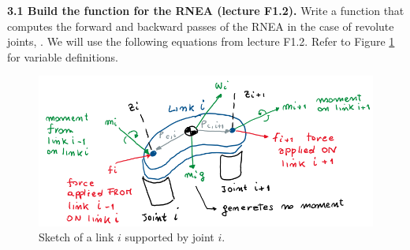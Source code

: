 \documentclass[11pt]{article}
\begin{document}
\textbf{3.1 Build the function for the RNEA (lecture F1.2).} Write a function that computes the forward and backward passes of the RNEA in the case of revolute joints, . We will use the following equations from lecture F1.2. Refer to Figure \ref{fig:rnea} for variable definitions.


\begin{figure}[H]
	\centering
	\includegraphics[width=12cm]{pics/rnea.png}
	\caption{Sketch of a link $i$ supported by joint $i$.}
	\label{fig:rnea}
\end{figure}
\end{document}
